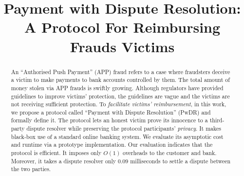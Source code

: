 \documentclass[sigconf,anonymous]{acmart}
\theoremstyle{remark}
\begin{document}
\newtheorem{claim}{Claim}[theorem]
\title{Payment with Dispute Resolution: \\ A Protocol For Reimbursing Frauds Victims}







\renewcommand{\shortauthors}{Trovato and Tobin, et al.}

\begin{abstract}
An ``Authorised Push Payment'' (APP) fraud refers to a case where fraudsters deceive a victim to make payments to bank accounts controlled by them.  The total amount of money stolen via APP frauds is swiftly growing. Although regulators have provided guidelines to improve victims’ protection, the guidelines are vague and the victims are not receiving sufficient protection. To  \emph{facilitate victims' reimbursement}, in this work, we propose a protocol called  ``Payment with Dispute Resolution'' (PwDR) and formally define it. The protocol lets an honest victim prove its innocence to a third-party dispute resolver while preserving the protocol participants' \emph{privacy}. It makes black-box use of a standard online banking system. We evaluate its asymptotic cost and runtime via a prototype implementation. Our evaluation indicates that the protocol is efficient. It imposes only $O(1)$ overheads to the customer and bank.  Moreover, it takes a dispute resolver only $0.09$ milliseconds to settle a dispute between the two parties.
\end{abstract}
\end{document}
